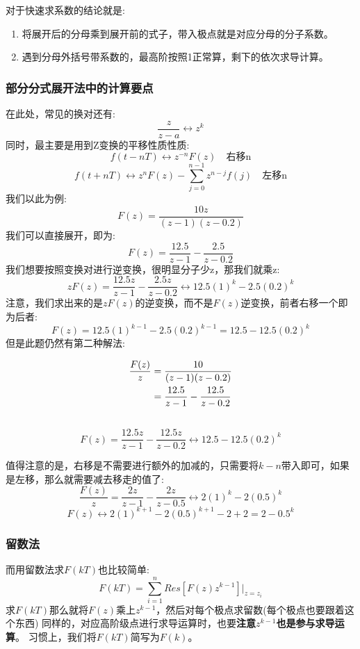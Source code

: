 \documentclass[12pt, a4paper, oneside]{ctexbook}
\begin{document}
对于快速求系数的结论就是:
\begin{enumerate} 
	\item 将展开后的分母乘到展开前的式子，带入极点就是对应分母的分子系数。
	\item 遇到分母外括号带系数的，最高阶按照1正常算，剩下的依次求导计算。
\end{enumerate}

\subsubsection{部分分式展开法中的计算要点}

\noindent 在此处，常见的换对还有:
$$\frac{z}{z-a}\leftrightarrow z^k$$
同时，最主要是用到Z变换的平移性质性质:
$$
f(t-nT) \leftrightarrow z^{-n}F(z) \quad \mbox{右移n}
$$
$$
f(t+nT) \leftrightarrow z^{n}F(z) - \sum_{j=0}^{n-1}z^{n-j}f(j) \quad \mbox{左移n}
$$
我们以此为例:
$$
F(z)=\frac{10z}{(z-1)(z-0.2)}
$$
我们可以直接展开，即为:
$$
F(z)=\frac{12.5}{z-1}-\frac{2.5}{z-0.2}
$$
我们想要按照变换对进行逆变换，很明显分子少z，那我们就乘z:
$$
zF(z)=\frac{12.5z}{z-1}-\frac{2.5z}{z-0.2}\leftrightarrow12.5(1)^k-2.5(0.2)^k
$$
注意，我们求出来的是$zF(z)$的逆变换，而不是$F(z)$逆变换，前者右移一个即为后者:
$$
F(z)=12.5(1)^{k-1}-2.5(0.2)^{k-1}=12.5-12.5(0.2)^k
$$
但是此题仍然有第二种解法:


\begin{equation}
	\begin{aligned}
	\frac{F(z)}{z}&=\frac{10}{(z-1)(z-0.2)}\\ \notag
	&=\frac{12.5}{z-1}-\frac{12.5}{z-0.2}\\ \notag
	\end{aligned}
\end{equation}
$$
F(z)=\frac{12.5z}{z-1}-\frac{12.5z}{z-0.2}\leftrightarrow 12.5-12.5(0.2)^k
$$

值得注意的是，右移是不需要进行额外的加减的，只需要将$k-n$带入即可，如果是左移，那么就需要减去移走的值了:
$$
\frac{F(z)}{z}=\frac{2z}{z-1}-\frac{2z}{z-0.5}\leftrightarrow2(1)^k-2(0.5)^k
$$
$$
F(z)\leftrightarrow2(1)^{k+1}-2(0.5)^{k+1}-2+2=2-0.5^k
$$
\subsubsection{留数法}

\noindent 而用留数法求$F(kT)$也比较简单:
$$
F(kT)=\sum_{i=1}^nRes[F(z)z^{k-1}]\bigg|_{z=z_i}
$$
求$F(kT)$那么就将$F(z)$乘上$z^{k-1}$，然后对每个极点求留数(每个极点也要跟着这个东西)
同样的，对应高阶级点进行求导运算时，也要\textbf{注意$z^{k-1}$也是参与求导运算}。
习惯上，我们将$F(kT)$简写为$F(k)$。
\end{document}
